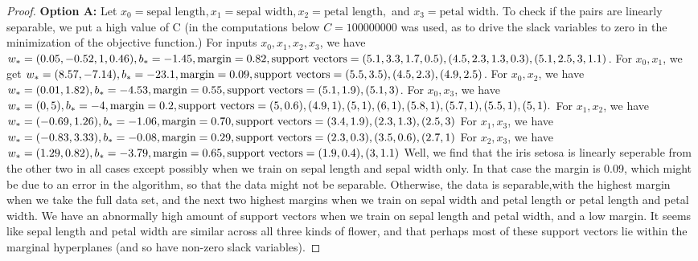\documentclass[12pt]{article}
\begin{document}
\begin{proof}  \bigbreak
  \textbf{ Option A:}
  Let $x_0 = \text {sepal length}, x_1 = \text{sepal width}, x_2 = \text{petal length},$ and $x_3 = \text{petal width}$. To check if the pairs are linearly separable, we put a high value of C
  (in the computations below $C = 100000000$ was used, as to drive the slack variables to zero in the minimization of the objective function.)
  \bigbreak
  For inputs $x_0,x_1,x_2,x_3$, we have $w_* = (0.05, -0.52, 1, 0.46), b_* = -1.45, \text{margin} = 0.82, \\
  \text{support vectors} = (5.1,3.3,1.7,0.5), (4.5,2.3,1.3,0.3), (5.1,2.5,3,1.1)$.
  \bigbreak
  For $x_0, x_1$, we get $w_* = (8.57, -7.14), b_* = -23.1, \text{margin} = 0.09, \\
  \text{support vectors} = (5.5,3.5), (4.5, 2.3), (4.9, 2.5)$.
  \bigbreak
  For $x_0, x_2$, we have $w_* = (0.01, 1.82), b_*=-4.53, \text{margin} = 0.55, \\
  \text{support vectors} = (5.1,1.9), (5.1, 3)$.
  \bigbreak
  For $x_0, x_3$, we have $w_* = (0, 5), b_* = -4, \text{margin} = 0.2, \\
  \text{support vectors} = (5, 0.6), (4.9,1), (5, 1), (6,1), (5.8, 1), (5.7, 1), (5.5, 1), (5, 1).$
  \bigbreak
  For $x_1, x_2$, we have $w_* = (-0.69, 1.26), b_* = -1.06, \text{margin} = 0.70, \\
  \text{support vectors} = (3.4,1.9), (2.3,1.3), (2.5,3)$
  \bigbreak
  For $x_1, x_3$, we have $w_* = (-0.83, 3.33), b_* = -0.08, \text{margin} = 0.29, \\
  \text{support vectors} = (2.3,0.3), (3.5, 0.6), (2.7, 1)$
  \bigbreak
  For $x_2, x_3$, we have $w_* = (1.29, 0.82), b_* = -3.79, \text{margin} = 0.65, \\
  \text{support vectors} = (1.9,0.4), (3, 1.1)$
  \bigbreak
  Well, we find that the iris setosa is linearly seperable from the other two in all cases except possibly when we train on sepal length and sepal width only. In that case the margin is 0.09, which
  might be due to an error in the algorithm, so that the data might not be separable. Otherwise, the data is separable,with the highest margin when we take the full data set, and the next two highest margins
  when we train on sepal width and petal length or petal length and petal width. We have an abnormally high amount of support vectors when we train on sepal length and petal width, and a low margin. It seems like
  sepal length and petal width are similar across all three kinds of flower, and that perhaps most of these support vectors lie within the marginal hyperplanes (and so have non-zero slack variables).

\end{proof}
\end{document}
